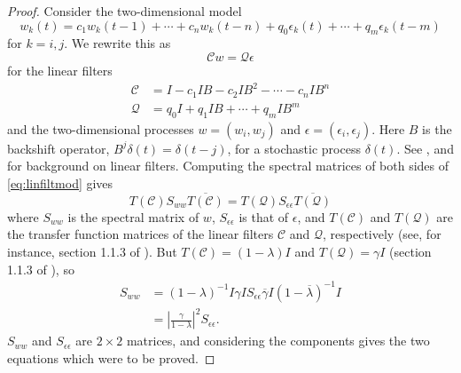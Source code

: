 \documentclass[letterpaper,11pt]{article}
\begin{document}
\begin{proof}
Consider the two-dimensional model
\begin{equation}
w_{k}(t) =c_{ 1}w_{k}(t- 1)+\cdots+c_{n}w_{k}(t-n)+q_{  0}\epsilon_{k}(t)  +\cdots+q_{m}\epsilon_{k}(t-m)
\end{equation}
for $k=i,j$. We rewrite this as
\begin{equation}
\mathcal{C} w = \mathcal{Q} \epsilon \label{eq:linfiltmod}
\end{equation}
for the linear filters
\begin{align}
\mathcal{C} &= I-c_1 IB - c_2 IB^2 - \cdots - c_n IB^n \\
\mathcal{Q} &= q_0 I + q_1 IB + \cdots + q_m IB^m
\end{align}
and the two-dimensional processes $w=(w_i,w_j)$ and $\epsilon = (\epsilon_{i},\epsilon_{j})$. Here $B$ is the backshift operator,
$B^{j}\delta(t)=\delta(t-j)$, for a stochastic process $\delta(t)$.
See \cite{Brillinger2011}, \cite{Reinsel1997} and \cite{Shumway2000}
for background on linear filters. Computing the spectral matrices of both
sides of \ref{eq:linfiltmod} gives
\begin{equation}
T(\mathcal{C}) S_{ww} \overline{T(\mathcal{C})} = T(\mathcal{Q}) S_{\epsilon\epsilon}
\overline{T(\mathcal{Q})}
\end{equation}
where $S_{ww}$ is the spectral matrix of $w$, $S_{\epsilon\epsilon}$
is that of $\epsilon$, and $T(\mathcal{C})$ and $T(\mathcal{Q})$ 
are the transfer function matrices of the linear filters
$\mathcal{C}$ and $\mathcal{Q}$, respectively (see, for instance,
section 1.1.3 of \citealp{Reinsel1997}). But 
$T(\mathcal{C}) = (1-\lambda)I$ and $T(\mathcal{Q})=\gamma I$
(section 1.1.3 of \citealp{Reinsel1997}), so
\begin{align}
S_{ww} &= (1-\lambda)^{-1} I \gamma I S_{\epsilon\epsilon} \overline{\gamma} I (1-\overline{\lambda})^{-1}I \\
&= \left| \frac{\gamma}{1-\lambda} \right|^2 S_{\epsilon\epsilon}.
\end{align}
$S_{ww}$ and $S_{\epsilon\epsilon}$ are $2 \times 2$ matrices, and considering the components gives the two equations which were to be proved.
\end{proof}
\end{document}
